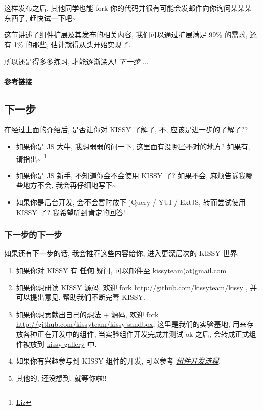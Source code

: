 \documentclass[letterpaper,10pt,english]{sphinxmanual}
\begin{document}
这样发布之后, 其他同学也能 fork 你的代码并很有可能会发邮件向你询问某某某东西了, 赶快试一下吧\textasciitilde{}

这节讲述了组件扩展及其发布的相关内容, 我们可以通过扩展满足 99\% 的需求, 还有 1\% 的那些, 估计就得从头开始实现了.

所以还是得多多练习, 才能逐渐深入! {\hyperref[quickstart/nextstep:nextstep]{\emph{下一步}}} ...
\paragraph{参考链接}


\subsection{下一步}
\label{quickstart/nextstep:nextstep}\label{quickstart/nextstep::doc}\label{quickstart/nextstep:id1}
在经过上面的介绍后, 是否让你对 KISSY 了解了, 不, 应该是进一步的了解了??
\begin{itemize}
\item {}
如果你是 JS 大牛, 我想弱弱的问一下, 这里面有没哪些不对的地方? 如果有, 请指出\textasciitilde{} \footnote{
\href{mailto:shengyan1985@gmail.com}{Liz}
}

\item {}
如果你是 JS 新手, 不知道你会不会使用 KISSY 了? 如果不会, 麻烦告诉我哪些地方不会, 我会再仔细地写下\textasciitilde{}

\item {}
如果你是后台开发, 会不会暂时放下 jQuery / YUI / ExtJS, 转而尝试使用 KISSY 了?  我希望听到肯定的回答!

\end{itemize}


\subsubsection{下一步的下一步}
\label{quickstart/nextstep:id3}
如果还有下一步的话, 我会推荐这些内容给你, 进入更深层次的 KISSY 世界:
\begin{enumerate}
\item {}
如果你对 KISSY 有 \textbf{任何} 疑问, 可以邮件至 \href{mailto:kissyteam(at)gmail.com}{kissyteam(at)gmail.com}

\item {}
如果你想研读 KISSY 源码, 欢迎 fork \href{http://github.com/kissyteam/kissy}{http://github.com/kissyteam/kissy} , 并可以提出意见, 帮助我们不断完善 KISSY.

\item {}
如果你想贡献出自己的想法 + 源码, 欢迎 fork \href{http://github.com/kissyteam/kissy-sandbox}{http://github.com/kissyteam/kissy-sandbox}, 这里是我们的实验基地, 用来存放各种正在开发中的组件, 当实验组件开发完成并测试 ok 之后, 会转成正式组件被放到  \href{http://github.com/kissyteam/kissy-gallery}{kissy-gallery} 中.

\item {}
如果你有兴趣参与到 KISSY 组件的开发, 可以参考 {\hyperref[workflow/index:workflow]{\emph{组件开发流程}}}.

\item {}
其他的, 还没想到, 就等你啦!!

\end{enumerate}
\end{document}
